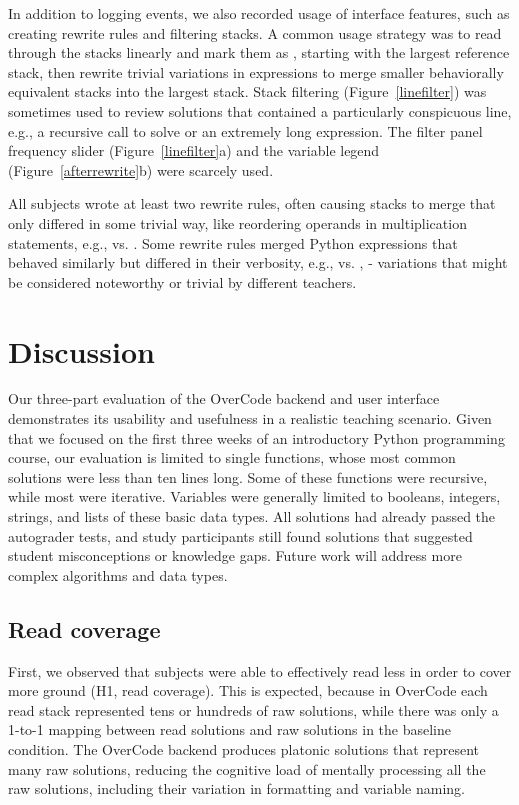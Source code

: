 In addition to logging  events, we also recorded usage of interface features, such as creating rewrite rules and filtering stacks. A common usage strategy was to read through the stacks linearly and mark them as , starting with the largest reference stack, then rewrite trivial variations in expressions to merge smaller behaviorally equivalent stacks into the largest stack. Stack filtering (Figure~\ref{linefilter}) was sometimes used to review solutions that contained a particularly conspicuous line, e.g., a recursive call to solve  or an extremely long expression. The filter panel frequency slider (Figure~\ref{linefilter}a) and the variable legend (Figure~\ref{afterrewrite}b) were scarcely used.

All subjects wrote at least two rewrite rules, often causing stacks to merge that only differed in some trivial way, like reordering operands in multiplication statements, e.g.,  vs. . Some rewrite rules merged Python expressions that behaved similarly but differed in their verbosity, e.g.,  vs. , - variations that might be considered noteworthy or trivial by different teachers.
\section{Discussion}

Our three-part evaluation of the OverCode backend and user interface demonstrates its usability and usefulness in a realistic teaching scenario. Given that we focused on the first three weeks of an introductory Python programming course, our evaluation is limited to single functions, whose most common solutions were less than ten lines long. Some of these functions were recursive, while most were iterative. Variables were generally limited to booleans, integers, strings, and lists of these basic data types. All solutions had already passed the autograder tests, and study participants still found solutions that suggested student misconceptions or knowledge gaps. Future work will address more complex algorithms and data types.

\subsection{Read coverage}
First, we observed that subjects were able to effectively read less in order to cover more ground (H1, read coverage). This is expected, because in OverCode each read stack represented tens or hundreds of raw solutions, while there was only a 1-to-1 mapping between read solutions and raw solutions in the baseline condition. The OverCode backend produces platonic solutions that represent many raw solutions, reducing the cognitive load of mentally processing all the raw solutions, including their variation in formatting and variable naming.

